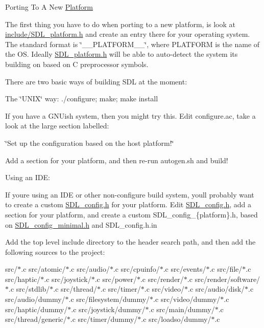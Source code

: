 
\begin{DoxyItemize}
\item Porting To A New \mbox{\hyperlink{class_platform}{Platform}}

The first thing you have to do when porting to a new platform, is look at \mbox{\hyperlink{_s_d_l__platform_8h}{include/\+SDL\+\_\+platform.\+h}} and create an entry there for your operating system. The standard format is \char`\"{}\+\_\+\+\_\+\+PLATFORM\+\_\+\+\_\+\char`\"{}, where PLATFORM is the name of the OS. Ideally \mbox{\hyperlink{_s_d_l__platform_8h}{SDL\+\_\+platform.\+h}} will be able to auto-\/detect the system it\textquotesingle{}s building on based on C preprocessor symbols.
\end{DoxyItemize}

There are two basic ways of building SDL at the moment\+:


\begin{DoxyEnumerate}
\item The \char`\"{}\+UNIX\char`\"{} way\+: ./configure; make; make install

If you have a GNUish system, then you might try this. Edit configure.\+ac, take a look at the large section labelled\+:

\char`\"{}\+Set up the configuration based on the host platform!\char`\"{}

Add a section for your platform, and then re-\/run autogen.\+sh and build!
\item Using an IDE\+:

If you\textquotesingle{}re using an IDE or other non-\/configure build system, you\textquotesingle{}ll probably want to create a custom \mbox{\hyperlink{_s_d_l__config_8h_source}{SDL\+\_\+config.\+h}} for your platform. Edit \mbox{\hyperlink{_s_d_l__config_8h_source}{SDL\+\_\+config.\+h}}, add a section for your platform, and create a custom SDL\+\_\+config\+\_\+\{platform\}.h, based on \mbox{\hyperlink{_s_d_l__config__minimal_8h}{SDL\+\_\+config\+\_\+minimal.\+h}} and SDL\+\_\+config.\+h.\+in

Add the top level include directory to the header search path, and then add the following sources to the project\+:

src/$\ast$.c src/atomic/$\ast$.c src/audio/$\ast$.c src/cpuinfo/$\ast$.c src/events/$\ast$.c src/file/$\ast$.c src/haptic/$\ast$.c src/joystick/$\ast$.c src/power/$\ast$.c src/render/$\ast$.c src/render/software/$\ast$.c src/stdlib/$\ast$.c src/thread/$\ast$.c src/timer/$\ast$.c src/video/$\ast$.c src/audio/disk/$\ast$.c src/audio/dummy/$\ast$.c src/filesystem/dummy/$\ast$.c src/video/dummy/$\ast$.c src/haptic/dummy/$\ast$.c src/joystick/dummy/$\ast$.c src/main/dummy/$\ast$.c src/thread/generic/$\ast$.c src/timer/dummy/$\ast$.c src/loadso/dummy/$\ast$.c
\end{DoxyEnumerate}

